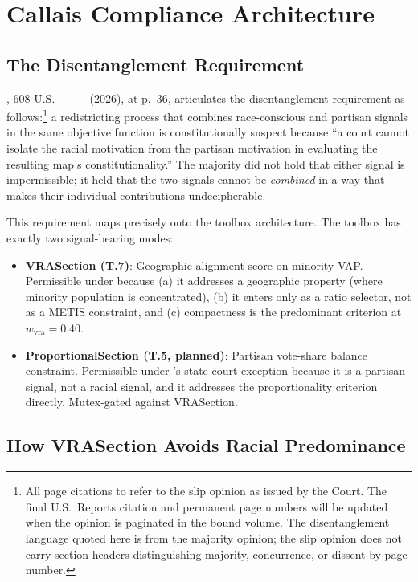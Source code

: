 \section{Callais Compliance Architecture}
\label{sec:callais}

\subsection{The Disentanglement Requirement}

\callais{}, 608 U.S.\ \_\_\_ (2026), at p.~36, articulates the disentanglement
requirement as follows:\footnote{%
  All page citations to \callais{} refer to the slip opinion as issued by the Court.
  The final U.S.\ Reports citation and permanent page numbers will be updated when
  the opinion is paginated in the bound volume.  The disentanglement language quoted
  here is from the majority opinion; the slip opinion does not carry section headers
  distinguishing majority, concurrence, or dissent by page number.}
a redistricting process that combines race-conscious and partisan signals in
the same objective function is constitutionally suspect because ``a court
cannot isolate the racial motivation from the partisan motivation in evaluating
the resulting map's constitutionality.''
The majority did not hold that either signal is impermissible; it held that
the two signals cannot be \emph{combined} in a way that makes their individual
contributions undecipherable.

This requirement maps precisely onto the toolbox architecture.
The toolbox has exactly two signal-bearing modes:
\begin{itemize}
  \item \textbf{VRASection (T.7)}: Geographic alignment score on minority VAP.
    Permissible under \callais{} because (a) it addresses a geographic property
    (where minority population is concentrated), (b) it enters only as a ratio
    selector, not as a METIS constraint, and (c) compactness is the predominant
    criterion at $w_\text{vra} = 0.40$.
  \item \textbf{ProportionalSection (T.5, planned)}: Partisan vote-share balance
    constraint.
    Permissible under \rucho{}'s state-court exception because it is a partisan
    signal, not a racial signal, and it addresses the proportionality criterion
    directly.
    Mutex-gated against VRASection.
\end{itemize}

\subsection{How VRASection Avoids Racial Predominance}


